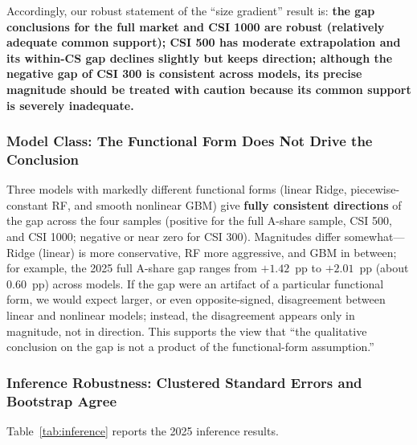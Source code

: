 \documentclass[11pt,a4paper]{article}
\begin{document}
Accordingly, our robust statement of the ``size gradient'' result is: \textbf{the gap conclusions for the full market and CSI 1000 are robust (relatively adequate common support); CSI 500 has moderate extrapolation and its within-CS gap declines slightly but keeps direction; although the negative gap of CSI 300 is consistent across models, its precise magnitude should be treated with caution because its common support is severely inadequate.}

\subsubsection{Model Class: The Functional Form Does Not Drive the Conclusion}

Three models with markedly different functional forms (linear Ridge, piecewise-constant RF, and smooth nonlinear GBM) give \textbf{fully consistent directions} of the gap across the four samples (positive for the full A-share sample, CSI 500, and CSI 1000; negative or near zero for CSI 300). Magnitudes differ somewhat---Ridge (linear) is more conservative, RF more aggressive, and GBM in between; for example, the 2025 full A-share gap ranges from $+1.42$~pp to $+2.01$~pp (about $0.60$~pp) across models. If the gap were an artifact of a particular functional form, we would expect larger, or even opposite-signed, disagreement between linear and nonlinear models; instead, the disagreement appears only in magnitude, not in direction. This supports the view that ``the qualitative conclusion on the gap is not a product of the functional-form assumption.''

\subsubsection{Inference Robustness: Clustered Standard Errors and Bootstrap Agree}

Table~\ref{tab:inference} reports the 2025 inference results.
\end{document}
